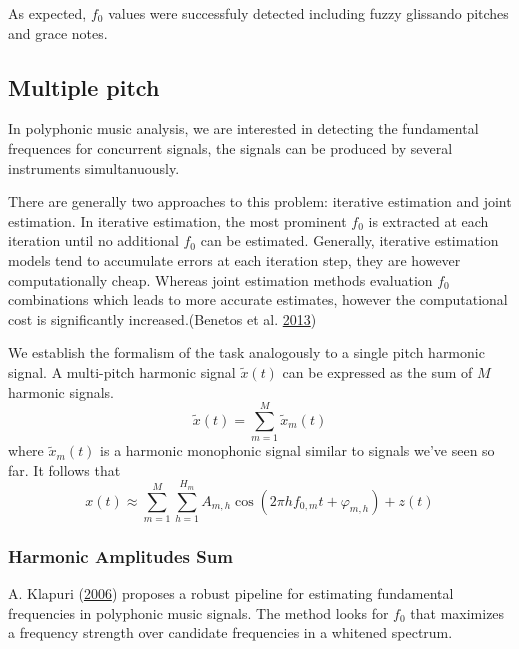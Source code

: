 \documentclass[american,]{article}
\begin{document}
As expected, \(f_0\) values were successfuly detected
including fuzzy glissando pitches and grace notes.

\hypertarget{multiple-pitch}{%
\subsection{Multiple pitch}\label{multiple-pitch}}

In polyphonic music analysis, we are interested in detecting
the fundamental frequences for concurrent signals,
the signals can be produced by several instruments simultanuously.

There are generally two approaches to this problem:
iterative estimation and joint estimation.
In iterative estimation, the most prominent \(f_0\) is extracted
at each iteration until no additional \(f_0\) can be estimated.
Generally, iterative estimation models tend to accumulate errors
at each iteration step, they are however computationally cheap.
Whereas joint estimation methods evaluation \(f_0\) combinations
which leads to more accurate estimates, however
the computational cost is significantly increased.(Benetos et al. \protect\hyperlink{ref-benetos_2013}{2013})

We establish the formalism of the task analogously to
a single pitch harmonic signal.
A multi-pitch harmonic signal \(\tilde{x}(t)\) can be expressed as the
sum of \(M\) harmonic signals.
\[\tilde{x}(t)=\sum_{m=1}^M \tilde{x}_m(t)\]
where \(\tilde{x}_m(t)\) is a harmonic monophonic signal
similar to signals we've seen so far.
It follows that
\[x(t)\approx \sum_{m=1}^{M} \sum_{h=1}^{H_m}
    A_{m,h} \cos(2\pi h f_{0,m}t + \varphi_{m,h}) + z(t)\]

\hypertarget{harmonic-amplitudes-sum}{%
\subsubsection{Harmonic Amplitudes Sum}\label{harmonic-amplitudes-sum}}

A. Klapuri (\protect\hyperlink{ref-klapuri}{2006}) proposes a robust pipeline for estimating
fundamental frequencies in polyphonic music signals.
The method looks for \(f_0\) that maximizes a frequency
strength over candidate frequencies in a whitened spectrum.
\end{document}

